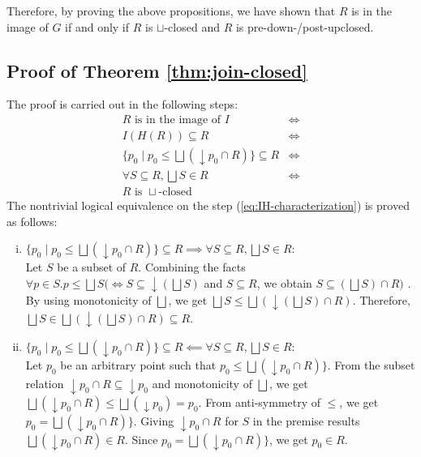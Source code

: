 \documentclass{llncs}
\newcommand{\join}{\sqcup}
\newcommand{\bigjoin}{\bigsqcup}
\begin{document}
Therefore, by proving the above propositions, we have shown that $R$ is in the image of $G$ if and only if $R$ is $\join$-closed and $R$ is pre-down-/post-upclosed.


\subsection{Proof of Theorem \ref{thm:join-closed}}
The proof is carried out in the following steps:
\begin{align*}
 R \text{ is in the image of } I &\iff \\
 I(H(R)) \subseteq R &\iff \\
  \{ p_{0} \mid p_{0} \leq \bigjoin (\downarrow p_{0} \cap R) \} \subseteq R &\iff \tag{*}\label{eq:IH-characterization}\\
\forall S \subseteq R, \bigjoin S \in R &\iff \\
R \text{ is }\join \text{-closed }
\end{align*}
The nontrivial logical equivalence on the step (\ref{eq:IH-characterization}) is proved as follows:
\begin{enumerate}[i.]
\item{$ \{ p_{0} \mid p_{0} \leq \bigjoin (\downarrow p_{0} \cap R) \} \subseteq R \implies \forall S \subseteq R, \bigjoin S \in R$}:\\
Let $S$ be a subset of $R$. Combining the facts $\forall p \in S. p \leq \bigjoin S (\iff S \subseteq \downarrow (\bigjoin S)$ and $S \subseteq R$, we obtain $S \subseteq (\bigjoin S) \cap R)$ . By using monotonicity of $\bigjoin$, we get $\bigjoin S \leq \bigjoin (\downarrow (\bigjoin S) \cap R)$. Therefore, $\bigjoin S \in \bigjoin (\downarrow (\bigjoin S) \cap R) \subseteq R$.

\item{$ \{ p_{0} \mid p_{0} \leq \bigjoin (\downarrow p_{0} \cap R) \} \subseteq R \impliedby \forall S \subseteq R, \bigjoin S \in R$:}\\
Let $p_0$ be an arbitrary point such that $p_{0} \leq \bigjoin (\downarrow p_{0} \cap R) \}$.
From the subset relation $\downarrow p_{0} \cap R \subseteq \downarrow p_{0}$ and monotonicity of $\bigjoin$, we get $\bigjoin (\downarrow p_{0} \cap R) \leq \bigjoin (\downarrow p_{0}) = p_{0}$. From anti-symmetry of $\leq$, we get $p_{0} = \bigjoin (\downarrow p_{0} \cap R) \}$.
Giving $\downarrow p_{0} \cap R$ for $S$ in the premise results $\bigjoin (\downarrow p_{0} \cap R) \in R$. Since $p_{0} = \bigjoin (\downarrow p_{0} \cap R) \}$, we get $p_{0} \in R$.
\end{enumerate}
\end{document}
